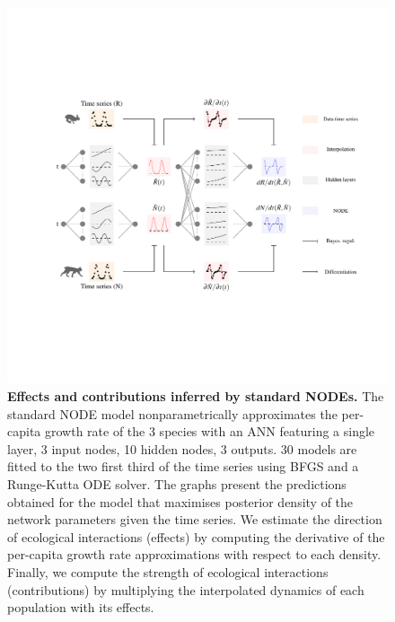 \documentclass[11pt, oneside]{article}
\begin{document}
\begin{figure}[H]
\includegraphics[width=1\linewidth,page=11]{figures/main.pdf}
\caption{
    \textbf{Effects and contributions inferred by standard NODEs.}
    The standard NODE model nonparametrically approximates the per-capita growth rate of the 3 species with an ANN featuring a single layer, 3 input nodes, 10 hidden nodes, 3 outputs.
    30 models are fitted to the two first third of the time series using BFGS and a Runge-Kutta ODE solver.
    The graphs present the predictions obtained for the model that maximises posterior density of the network parameters given the time series.
    We estimate the direction of ecological interactions (effects) by computing the derivative of the per-capita growth rate approximations with respect to each density.
    Finally, we compute the strength of ecological interactions (contributions) by multiplying the interpolated dynamics of each population with its effects.
}
\end{figure}
\newpage
\end{document}
